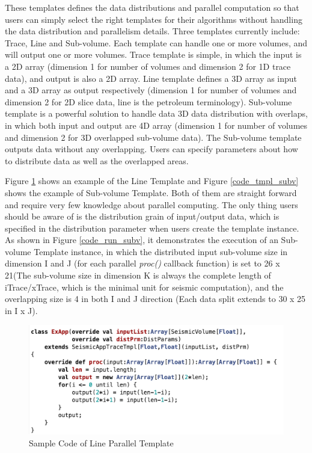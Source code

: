 These templates defines the data distributions and parallel computation so that users can simply select the right templates for their algorithms without handling the data distribution and parallelism details. Three templates currently include: Trace, Line and Sub-volume. Each template can handle one or more volumes, and will output one or more volumes. Trace template is simple, in which the input is a 2D array (dimension 1 for number of volumes and dimension 2 for 1D trace data), and output is also a 2D array. Line template defines a 3D array as input and a 3D array as output respectively (dimension 1 for number of volumes and dimension 2 for 2D slice data, line is the petroleum terminology). Sub-volume template is a powerful solution to handle data 3D data distribution with overlaps, in which both input and output are 4D array (dimension 1 for number of volumes and dimension 2 for 3D overlapped sub-volume data). The Sub-volume template outputs data without any overlapping. Users can specify parameters about how to distribute data as well as the overlapped areas. 

Figure \ref{code_tmpl_line} shows an example of the Line Template and Figure \ref{code_tmpl_subv} shows the example of Sub-volume Template. Both of them are straight forward and require very few knowledge about parallel computing. The only thing users should be aware of is the distribution grain of input/output data, which is specified in the distribution parameter when users create the template instance. As shown in Figure \ref{code_run_subv}, it demonstrates the execution of an Sub-volume Template instance, in which the distributed input sub-volume size in dimension I and J (for each parallel \emph{proc()} callback function) is set to 26 x 21(The sub-volume size in dimension K is always the complete length of iTrace/xTrace, which is the minimal unit for seismic computation), and the overlapping size is 4 in both I and J direction (Each data split extends to 30 x 25 in I x J). 

\begin{figure}[h]
\centering
\includegraphics[scale=0.55]{figures/code_tmpl_line.png}
\caption{Sample Code of Line Parallel Template}
\label{code_tmpl_line}
\end{figure}

